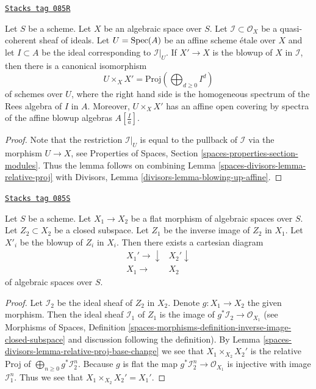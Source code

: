 \begin{lemma}
\label{spaces-divisors-lemma-blowing-up-affine}
\href{https://stacks.math.columbia.edu/tag/085R}{\texttt{Stacks tag 085R}}

Let $S$ be a scheme. Let $X$ be an algebraic space over $S$.
Let $\mathcal{I} \subset \mathcal{O}_X$ be a
quasi-coherent sheaf of ideals. Let $U = \operatorname{Spec}(A)$ be an affine scheme
\'etale over $X$ and let $I \subset A$ be the ideal corresponding to
$\mathcal{I}|_U$. If $X' \to X$ is the blowup of $X$ in $\mathcal{I}$,
then there is a canonical isomorphism
$$
U \times_X X' = \text{Proj}(\bigoplus\nolimits_{d \geq 0} I^d)
$$
of schemes over $U$, where the right hand side is
the homogeneous spectrum of the Rees algebra of $I$ in $A$.
Moreover, $U \times_X X'$ has an affine open covering by
spectra of the affine blowup algebras $A[\frac{I}{a}]$.
\end{lemma}

\begin{proof}
Note that the restriction $\mathcal{I}|_U$ is equal to the pullback
of $\mathcal{I}$ via the morphism $U \to X$, see
Properties of Spaces, Section \ref{spaces-properties-section-modules}.
Thus the lemma follows on combining Lemma \ref{spaces-divisors-lemma-relative-proj} with
Divisors, Lemma \ref{divisors-lemma-blowing-up-affine}.
\end{proof}

\begin{lemma}
\label{spaces-divisors-lemma-flat-base-change-blowing-up}
\href{https://stacks.math.columbia.edu/tag/085S}{\texttt{Stacks tag 085S}}

Let $S$ be a scheme.
Let $X_1 \to X_2$ be a flat morphism of algebraic spaces over $S$.
Let $Z_2 \subset X_2$ be a closed subspace.
Let $Z_1$ be the inverse image of $Z_2$ in $X_1$.
Let $X'_i$ be the blowup of $Z_i$ in $X_i$. Then there exists a cartesian
diagram
$$
\begin{array}{cc}X_1' \longrightarrow\downarrow & X_2' \downarrow \\ X_1 \longrightarrow & X_2\end{array}
$$
of algebraic spaces over $S$.
\end{lemma}

\begin{proof}
Let $\mathcal{I}_2$ be the ideal sheaf of $Z_2$ in $X_2$.
Denote $g : X_1 \to X_2$ the given morphism. Then the ideal sheaf
$\mathcal{I}_1$ of $Z_1$ is the image of
$g^*\mathcal{I}_2 \to \mathcal{O}_{X_1}$
(see Morphisms of Spaces, Definition
\ref{spaces-morphisms-definition-inverse-image-closed-subspace}
and discussion following the definition).
By Lemma \ref{spaces-divisors-lemma-relative-proj-base-change}
we see that $X_1 \times_{X_2} X_2'$ is the relative Proj of
$\bigoplus_{n \geq 0} g^*\mathcal{I}_2^n$. Because $g$ is flat the map
$g^*\mathcal{I}_2^n \to \mathcal{O}_{X_1}$ is injective with image
$\mathcal{I}_1^n$. Thus we see that $X_1 \times_{X_2} X_2' = X_1'$.
\end{proof}

